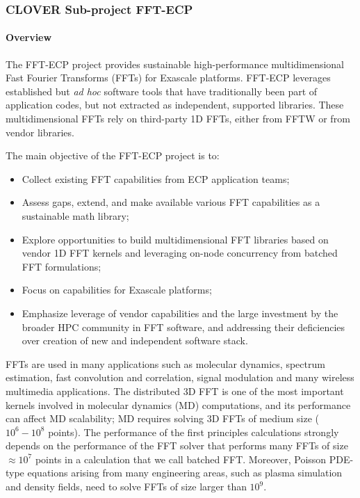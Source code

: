 \subsubsection{ CLOVER Sub-project FFT-ECP}\label{subsubsect:fftecp}


\paragraph{Overview}

The FFT-ECP project provides sustainable high-performance multidimensional
Fast Fourier Transforms (FFTs) for Exascale platforms. 
FFT-ECP leverages established but {\it ad hoc} 
software tools that have traditionally been part of application 
codes, but not extracted as independent, supported libraries. 
These multidimensional FFTs rely on third-party 1D FFTs, either from FFTW or 
from vendor libraries.

The main objective of the FFT-ECP project is to:
\begin{itemize}
\item Collect existing FFT capabilities from ECP 
      application teams;
\item Assess gaps, extend, and make available various FFT
      capabilities as a sustainable math library;
\item Explore opportunities to build multidimensional FFT libraries based 
      on vendor 1D FFT kernels and leveraging on-node concurrency from 
      batched FFT formulations;
\item Focus on capabilities for Exascale platforms;
\item Emphasize leverage of vendor capabilities 
      and the large investment by the broader HPC community in FFT
      software, and addressing their 
      deficiencies over creation of new and independent software stack.
\end{itemize}

FFTs are used in many applications such as molecular dynamics, 
spectrum estimation, fast convolution and correlation, signal 
modulation and many wireless multimedia applications. The 
distributed 3D FFT is one of the most important kernels involved 
in molecular dynamics (MD) computations, and its performance can 
affect MD scalability; MD requires solving 3D FFTs 
of medium size ($10^6-10^8$ points). The performance of the first 
principles calculations strongly depends on the performance of the 
FFT solver that performs many FFTs of size $\approx 10^7$ points in 
a calculation that we call batched FFT. Moreover, Poisson PDE-type 
equations arising from many engineering areas, such as plasma
simulation and density fields, need to solve FFTs of size larger than $10^9$. 


